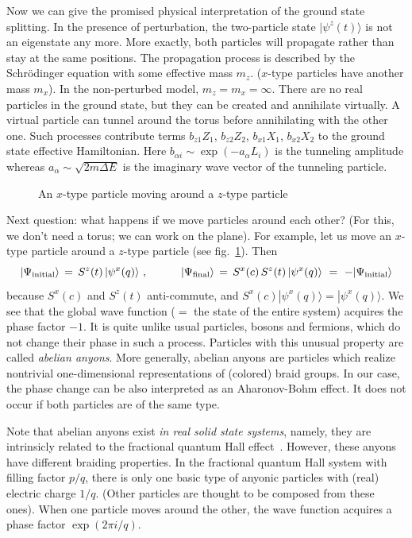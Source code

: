 \documentclass[12pt]{article}
\newcommand*{\epsfscale}[1]{\def\epsfsize##1##2{#1##1}}
\begin{document}
Now we can give the promised physical interpretation of the ground state 
splitting. In the presence of perturbation, the two-particle state 
$|\psi^z(t)\rangle$ is not an eigenstate any more. More exactly, both 
particles will propagate rather than stay at the same positions. The 
propagation process is described by the Schr\"odinger equation with some 
effective mass $m_z$. ($x$-type particles have another mass $m_x$). In the 
non-perturbed model, $m_z=m_x=\infty$. There are no real particles in the 
ground state, but they can be created and annihilate virtually. A virtual 
particle can tunnel around the torus before annihilating with the other one. 
Such processes contribute terms 
$b_{z1}Z_1$, $b_{z2}Z_2$, $b_{x1}X_1$, $b_{x2}X_2$ to the ground state 
effective Hamiltonian. Here $b_{\alpha i}\sim\exp(-a_\alpha L_i)$ is the 
tunneling amplitude whereas $a_\alpha\sim\sqrt{2m\Delta\!E}$ is the imaginary 
wave vector of the tunneling particle.

\begin{figure}[t]
\centerline{\epsfscale{0.6}}
\caption{An $x$-type particle moving around a $z$-type particle}
\label{fig_movearou}
\end{figure}

Next question: what happens if we move particles around each other? (For this, 
we don't need a torus; we can work on the plane). For example, let us move 
an $x$-type particle around a $z$-type particle (see fig.~\ref{fig_movearou}). 
Then 
\[
  |\Psi_{\mbox{\scriptsize initial}}\rangle\, =\, S^z(t)\,|\psi^x(q)\rangle
  \ ,\qquad\quad
  |\Psi_{\mbox{\scriptsize final}}\rangle\, =\, 
  S^x(c)\,S^z(t)\,|\psi^x(q)\rangle\ =\ 
  -|\Psi_{\mbox{\scriptsize initial}}\rangle
\]
because $S^x(c)$ and $S^z(t)$ anti-commute, and 
$S^x(c)|\psi^x(q)\rangle=|\psi^x(q)\rangle$.
We see that the global wave function ($=$ the state of the entire system) 
acquires the phase factor $-1$. It is quite unlike usual particles, bosons 
and fermions, which do not change their phase in such a process. Particles 
with this unusual property are called \emph{abelian anyons}. More generally, 
abelian anyons are particles which realize nontrivial one-dimensional 
representations of (colored) braid groups. In our case, the phase change 
can be also interpreted as an Aharonov-Bohm effect. It does not occur if both 
particles are of the same type.

Note that abelian anyons exist \emph{in real solid state systems}, namely, 
they are intrinsicly related to the fractional quantum Hall effect~\cite{ASW}. 
However, these anyons have different braiding properties. In the fractional 
quantum Hall system with filling factor $p/q$, there is only one basic type of 
anyonic particles with (real) electric charge $1/q$. (Other particles are 
thought to be composed from these ones). When one particle moves around the 
other, the wave function acquires a phase factor $\exp(2\pi i/q)$.
\end{document}
